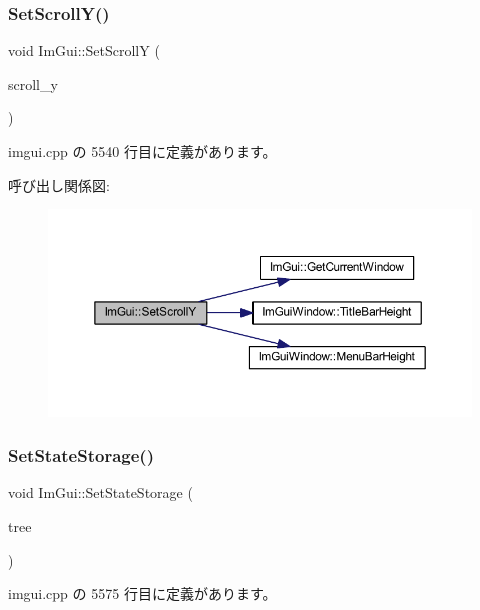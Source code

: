 \subsubsection{\texorpdfstring{Set\+Scroll\+Y()}{SetScrollY()}}
{\footnotesize\ttfamily void Im\+Gui\+::\+Set\+ScrollY (\begin{DoxyParamCaption}\item[{float}]{scroll\+\_\+y }\end{DoxyParamCaption})}



 imgui.\+cpp の 5540 行目に定義があります。

呼び出し関係図\+:\nopagebreak
\begin{figure}[H]
\begin{center}
\leavevmode
\includegraphics[width=350pt]{namespace_im_gui_a41833555962807384432e6fc94d46ec9_cgraph}
\end{center}
\end{figure}
\mbox{\label{namespace_im_gui_a635f4511603cc6284d8b21fb8d53090d}} 
\subsubsection{\texorpdfstring{Set\+State\+Storage()}{SetStateStorage()}}
{\footnotesize\ttfamily void Im\+Gui\+::\+Set\+State\+Storage (\begin{DoxyParamCaption}\item[{\mbox{\hyperlink{struct_im_gui_storage}{Im\+Gui\+Storage}} $\ast$}]{tree }\end{DoxyParamCaption})}



 imgui.\+cpp の 5575 行目に定義があります。

